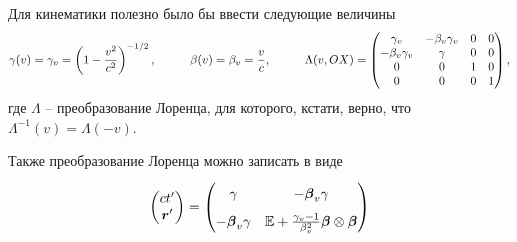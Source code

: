 Для кинематики полезно было бы ввести следующие величины
\begin{equation*}
    \gamma(v) = \gamma_v = \left(1 - \frac{v^2}{c^2}\right)^{-1/2},
    \hspace{1 cm}
    \beta(v) = \beta_v = \frac{v}{c},
    \hspace{1 cm}
    \Lambda(v, OX) = \begin{pmatrix}
        \gamma_v & - \beta_v \gamma_v & 0 & 0\\
        - \beta_v \gamma_v & \gamma & 0 & 0\\
        0 & 0 & 1 & 0\\
        0 & 0 & 0 & 1\\
    \end{pmatrix},
\end{equation*}
где $\Lambda$ -- преобразование Лоренца, для которого, кстати, верно, что $\Lambda^{-1} (v) = \Lambda(-v)$.

Также преобразование Лоренца можно записать в виде
\begin{equation}
\label{LORENTS}
    \begin{pmatrix}
        c t' \\ \vc{r}'
    \end{pmatrix} = 
    \begin{pmatrix}
        \gamma & - \vc{\beta}_v \gamma 
        \vphantom{\dfrac{1}{2}} \\
        - \vc{\beta}_v \gamma & \mathbb{E} + \frac{\gamma_v - 1}{\beta_v^2} \vc{\beta} \otimes \vc{\beta}  
        \vphantom{\dfrac{1}{2}} \\
    \end{pmatrix}
\end{equation}